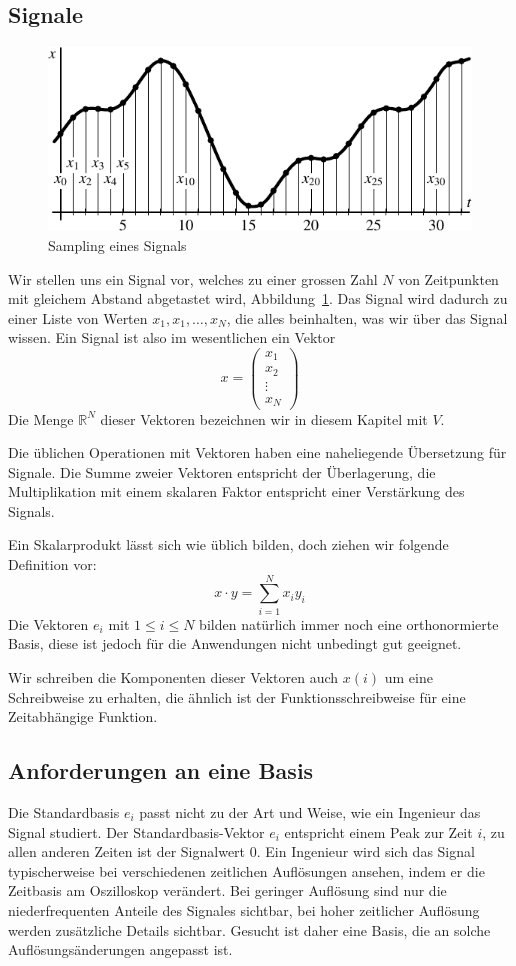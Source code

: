 \subsection{Signale}
\begin{figure}
\begin{center}
\includegraphics[width=0.9\hsize]{images/signal-1}
\end{center}
\caption{Sampling eines Signals\label{signal:vector}}
\end{figure}
Wir stellen uns ein Signal vor, welches zu einer grossen Zahl $N$
von Zeitpunkten mit gleichem Abstand abgetastet wird,
Abbildung~\ref{signal:vector}. Das Signal
wird dadurch zu einer Liste von Werten $x_1,x_1,\dots,x_N$, die
alles beinhalten, was wir über das Signal wissen. Ein Signal
ist also im wesentlichen ein Vektor
$$
x=\begin{pmatrix}x_1\\x_2\\\vdots\\x_N\end{pmatrix}
$$
Die Menge $\mathbb R^N$ dieser Vektoren bezeichnen wir in diesem
Kapitel mit $V$. 

Die üblichen Operationen mit Vektoren haben eine naheliegende
Übersetzung für Signale. Die Summe zweier Vektoren entspricht
der Überlagerung, die Multiplikation mit einem skalaren Faktor
entspricht einer Verstärkung des Signals. 

Ein Skalarprodukt lässt sich wie üblich bilden, doch ziehen
wir folgende Definition vor:
$$
x\cdot y=\sum_{i=1}^Nx_iy_i
$$
Die Vektoren $e_i$ mit $1\le i\le N$ bilden natürlich immer noch
eine orthonormierte Basis, diese ist jedoch für die Anwendungen
nicht unbedingt gut geeignet.

Wir schreiben die Komponenten dieser Vektoren auch $x(i)$ um
eine Schreibweise zu erhalten, die ähnlich ist der Funktionsschreibweise
für eine Zeitabhängige Funktion.

\subsection{Anforderungen an eine Basis}
Die Standardbasis $e_i$ passt nicht zu der Art und Weise, wie ein
Ingenieur das Signal studiert. Der Standardbasis-Vektor $e_i$
entspricht einem Peak zur Zeit $i$, zu allen anderen Zeiten
ist der Signalwert $0$.
Ein Ingenieur wird sich das Signal
typischerweise bei verschiedenen zeitlichen Auflösungen
ansehen, indem er die Zeitbasis am Oszilloskop verändert.
Bei geringer Auflösung sind nur die niederfrequenten
Anteile des Signales sichtbar, bei hoher zeitlicher Auflösung
werden zusätzliche Details sichtbar.
Gesucht ist daher eine Basis, die an solche Auflösungsänderungen
angepasst ist.

